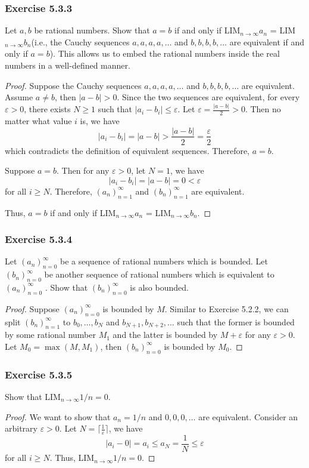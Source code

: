 \documentclass[12pt, letter]{article}
\newcommand{\an}{$(a_n)_{n=1}^\infty$ }
\newcommand{\bn}{$(b_n)_{n=1}^\infty$ }
\newcommand{\anz}{$(a_n)_{n=0}^\infty$ }
\newcommand{\bnz}{$(b_n)_{n=0}^\infty$ }
\newcommand{\la}{LIM$_{n\to\infty}a_n$  }
\newcommand{\lb}{LIM$_{n\to\infty}b_n$}
\begin{document}
\subsubsection*{Exercise 5.3.3}
Let $a,b$ be rational numbers. Show that $a=b$ if and only if \la = \lb (i.e., the Cauchy sequences $a,a,a,a,\dotsc$ and $b,b,b,b,\dotsc$ are equivalent if and only if $a=b$).
This allows us to embed the rational numbers inside the real numbers in a well-defined manner.
\begin{proof}
    Suppose the Cauchy sequences $a,a,a,a,\dotsc$ and $b,b,b,b,\dotsc$ are equivalent. Assume $a\ne b$, then $|a-b|>0$. Since the two sequences are equivalent, for every $\varepsilon>0$,
    there exists $N\geq 1$ such that $|a_i-b_i|\leq \varepsilon$. Let $\varepsilon=\frac{|a-b|}{2}>0$. Then no matter what value $i$ is, we have 
    \begin{equation*}
        |a_i-b_i|=|a-b|>\frac{|a-b|}{2}=\frac{\varepsilon}{2}
    \end{equation*}
    which contradicts the definition of equivalent sequences. Therefore, $a=b$.

    Suppose $a=b$. Then for any $\varepsilon>0$, let $N=1$, we have 
    \begin{equation*}
        |a_i-b_i|=|a-b|=0<\varepsilon
    \end{equation*}
    for all $i\geq N$. Therefore, \an and \bn are equivalent.

    Thus, $a=b$ if and only if \la = \lb.
\end{proof}
\subsubsection*{Exercise 5.3.4}
Let \anz be a sequence of rational numbers which is bounded. Let \bnz be another sequence of rational numbers which is equivalent to \anz. 
Show that \bnz is also bounded.
\begin{proof}
    Suppose \anz is bounded by $M$. Similar to Exercise 5.2.2, we can split \bn to $b_0,\dotsc,b_N$ and $b_{N+1},b_{N+2},\dotsc$ such that the former is bounded by some rational number $M_1$ and 
    the latter is bounded by $M+\varepsilon$ for any $\varepsilon>0$. Let $M_0=\max(M,M_1)$, then \bnz is bounded by $M_0$. 
\end{proof}
\subsubsection*{Exercise 5.3.5}
Show that LIM$_{n\to\infty}1/n=0$. 
\begin{proof}
    We want to show that $a_n=1/n$ and $0,0,0,\dotsc$ are equivalent. Consider an arbitrary $\varepsilon>0$. Let $N=\lceil\frac{1}{\varepsilon}\rceil$, we have 
    \begin{equation*}
        |a_i-0|=a_i\leq a_N=\frac{1}{N}\leq \varepsilon
    \end{equation*}
    for all $i\geq N$. 
    Thus, LIM$_{n\to\infty}1/n=0$. 
\end{proof}
\end{document}
